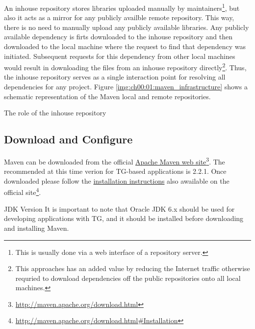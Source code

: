   An inhouse repository stores libraries uploaded manually by maintainers\footnote{This is usually done via a web interface of a repository server.}, but also it acts as a mirror for any publicly availble remote repository.
  This way, there is no need to manually upload any publicly available libraries.
  Any publicly available dependency is firts downloaded to the inhouse repository and then downloaded to the local machine where the request to find that dependency was initiated.
  Subsequent requests for this dependency from other local machines would result in downloading the files from an inhouse repository directly\footnote{
  This approaches has an added value by reducing the Internet traffic otherwise requried to download dependencies off the public repositories onto all local machines.
  }.  
  Thus, the inhouse repository serves as a single interaction point for resolving all dependencies for any project.
  Figure \ref{img:ch00:01:maven_infrastructure} shows a schematic representation of the Maven local and remote repositories.

  \begin{image}{The role of the inhouse repository}{\label{img:ch00:01:maven_infrastructure}}    
  \end{image}

  \subsection*{Download and Configure} 
  Maven can be downloaded from the official \href{http://maven.apache.org/download.html}{Apache Maven web site}\footnote{\url{http://maven.apache.org/download.html}}.
  The recommended at this time verion for TG-based applications is 2.2.1.
  Once downloaded please follow the \href{http://maven.apache.org/download.html#Installation}{installation instructions} also awailable on the official site\footnote{\url{http://maven.apache.org/download.html\#Installation}}.
  
  \begin{notebox}{JDK Version}{\label{mb:java}}
    It is important to note that Oracle JDK 6.x should be used for developing applications with TG, and it should be installed before downloading and installing Maven. 
  \end{notebox}
  
